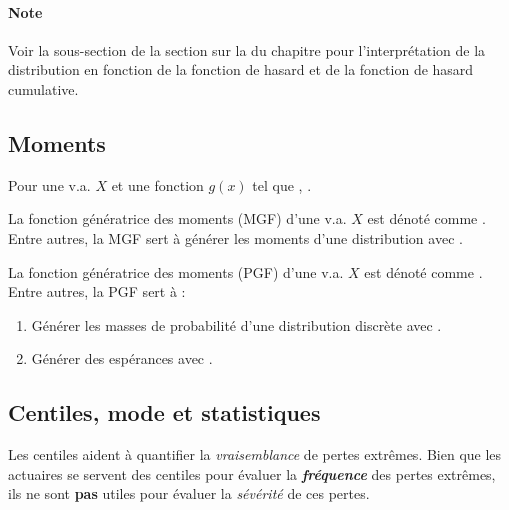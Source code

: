 \documentclass[10pt, french]{article}
\begin{document}
\begin{multicols*}{2}
\paragraph{Note}	Voir la sous-section \textit{\underline{}} de la section sur la \textit{\underline{}} du chapitre \textit{\underline{}} pour l'interprétation de la distribution en fonction de la fonction de hasard et de la fonction de hasard cumulative.


\columnbreak
\subsection{Moments}
Pour une v.a. $X$   et une fonction $g(x)$ tel que  , .

\begin{definitionNOHFILL}
La fonction génératrice des moments (MGF) d'une v.a. $X$ est dénoté comme .\\

Entre autres, la MGF sert à générer les moments d'une distribution avec .
\end{definitionNOHFILL}

\begin{definitionNOHFILL}
La fonction génératrice des moments (PGF) d'une v.a. $X$ est dénoté comme .\\

Entre autres, la PGF sert à :  
\begin{enumerate}
	\item	Générer les masses de probabilité d'une distribution discrète avec .
	\item	Générer des espérances avec .
\end{enumerate}
\end{definitionNOHFILL}


\columnbreak
\subsection{Centiles, mode et statistiques}
\begin{definitionNOHFILL}[Centile]
\begin{rappel_enhanced}[Contexte]
Les centiles aident à quantifier la \textit{vraisemblance} de pertes extrêmes. Bien que les actuaires se servent des centiles pour évaluer la \textit{\textbf{fréquence}} des pertes extrêmes, ils ne sont \textbf{pas} utiles pour évaluer la \textit{sévérité} de ces pertes.
\end{rappel_enhanced}


\end{definitionNOHFILL}
\end{multicols*}
\end{document}
